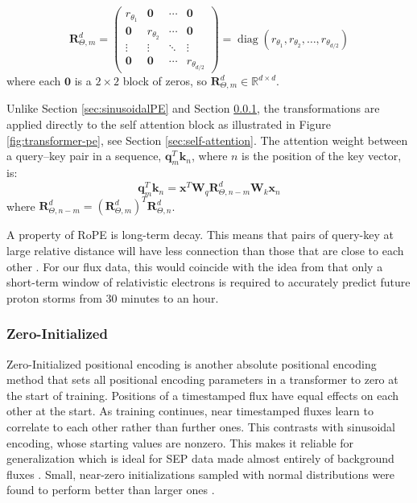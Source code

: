 \begin{equation}
\mathbf{R}^{d}_{\Theta,m} =
\begin{pmatrix}
r_{\theta_1} & \mathbf{0} & \cdots & \mathbf{0} \\
\mathbf{0} & r_{\theta_2} & \cdots & \mathbf{0} \\
\vdots & \vdots & \ddots & \vdots \\
\mathbf{0} & \mathbf{0} & \cdots & r_{\theta_{d/2}}
\end{pmatrix}
= \operatorname{diag}\!\left(r_{\theta_1}, r_{\theta_2}, \dots, r_{\theta_{d/2}}\right)
\end{equation}
where each $\mathbf{0}$ is a $2 \times 2$ block of zeros, so $\mathbf{R}^{d}_{\Theta,m} \in \mathbb{R}^{d \times d}$.

Unlike Section \ref{sec:sinusoidalPE} and Section \ref{sec:ZeroPE}, the transformations are applied
directly to the self attention block as illustrated in Figure \ref{fig:transformer-pe}, see Section \ref{sec:self-attention}.
The attention weight between a query--key pair in a sequence, $\mathbf{q}_m^T \mathbf{k}_n$, where $n$ is the position of the key vector,
is:
\begin{equation}
    \mathbf{q}_m^T \mathbf{k}_n = \mathbf{x}^T\mathbf{W}_q\mathbf{R}_{\Theta, n-m}^d \mathbf{W}_k\mathbf{x}_n
\end{equation}
where $ \mathbf{R}_{\Theta, n-m}^d = (\mathbf{R}_{\Theta, m}^d)^T \mathbf{R}_{\Theta, n}^d$.

A property of RoPE is long-term decay.
This means that pairs of query-key at large relative distance will have less connection than those that are close to each other \cite{su2021roformer}.
For our flux data, this would coincide with the idea from  that only a short-term window of relativistic electrons is required to accurately predict future proton storms from 30 minutes to an hour. 

\subsubsection{Zero-Initialized}
\label{sec:ZeroPE}
Zero-Initialized positional encoding is another absolute positional encoding method that sets all positional encoding parameters in a transformer to zero at the start of training. Positions of a timestamped flux have equal effects on each other at the start. As training continues, near timestamped fluxes learn to correlate to each other rather than further ones.
This contrasts with sinusoidal encoding, whose starting values are nonzero.
This makes it reliable for generalization which is ideal for SEP data made almost entirely of background fluxes \cite{torres2025machine}.
Small, near-zero initializations sampled with normal distributions were found to perform better than larger ones \cite{ito2024learning}.

